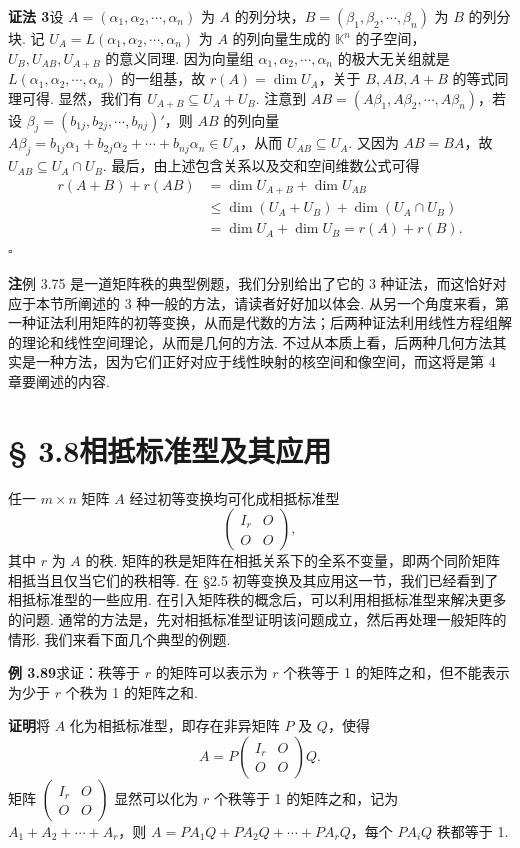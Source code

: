 \documentclass[UTF8,12pt,a4paper,fontset=fandol]{ctexart}
\begin{document}
\noindent\textbf{证法 3}\quad 设 $A=(\alpha_1,\alpha_2,\cdots,\alpha_n)$ 为 $A$ 的列分块，$B=(\beta_1,\beta_2,\cdots,\beta_n)$ 为 $B$ 的列分块. 记 $U_A=L(\alpha_1,\alpha_2,\cdots,\alpha_n)$ 为 $A$ 的列向量生成的 $\mathbb{K}^n$ 的子空间，$U_B,U_{AB},U_{A+B}$ 的意义同理. 因为向量组 $\alpha_1,\alpha_2,\cdots,\alpha_n$ 的极大无关组就是 $L(\alpha_1,\alpha_2,\cdots,\alpha_n)$ 的一组基，故 $r(A)=\dim U_A$，关于 $B,AB,A+B$ 的等式同理可得. 显然，我们有 $U_{A+B}\subseteq U_A+U_B$. 注意到 $AB=(A\beta_1,A\beta_2,\cdots,A\beta_n)$，若设 $\beta_j=(b_{1j},b_{2j},\cdots,b_{nj})'$，则 $AB$ 的列向量 $A\beta_j=b_{1j}\alpha_1+b_{2j}\alpha_2+\cdots+b_{nj}\alpha_n\in U_A$，从而 $U_{AB}\subseteq U_A$. 又因为 $AB=BA$，故 $U_{AB}\subseteq U_A\cap U_B$. 最后，由上述包含关系以及交和空间维数公式可得
\[
\begin{aligned}
r(A+B)+r(AB)&=\dim U_{A+B}+\dim U_{AB}\\
&\le \dim(U_A+U_B)+\dim(U_A\cap U_B)\\
&=\dim U_A+\dim U_B=r(A)+r(B).
\end{aligned}
\]
$\square$

\noindent\textbf{注}\quad 例 3.75 是一道矩阵秩的典型例题，我们分别给出了它的 3 种证法，而这恰好对应于本节所阐述的 3 种一般的方法，请读者好好加以体会. 从另一个角度来看，第一种证法利用矩阵的初等变换，从而是代数的方法；后两种证法利用线性方程组解的理论和线性空间理论，从而是几何的方法. 不过从本质上看，后两种几何方法其实是一种方法，因为它们正好对应于线性映射的核空间和像空间，而这将是第 4 章要阐述的内容.

\section*{§ 3.8\quad 相抵标准型及其应用}

任一 $m\times n$ 矩阵 $A$ 经过初等变换均可化成相抵标准型
\[
\begin{pmatrix}I_r&O\\O&O\end{pmatrix},
\]
其中 $r$ 为 $A$ 的秩. 矩阵的秩是矩阵在相抵关系下的全系不变量，即两个同阶矩阵相抵当且仅当它们的秩相等. 在 §2.5 初等变换及其应用这一节，我们已经看到了相抵标准型的一些应用. 在引入矩阵秩的概念后，可以利用相抵标准型来解决更多的问题. 通常的方法是，先对相抵标准型证明该问题成立，然后再处理一般矩阵的情形. 我们来看下面几个典型的例题.

\noindent\textbf{例 3.89}\quad 求证：秩等于 $r$ 的矩阵可以表示为 $r$ 个秩等于 1 的矩阵之和，但不能表示为少于 $r$ 个秩为 1 的矩阵之和.

\noindent\textbf{证明}\quad 将 $A$ 化为相抵标准型，即存在非异矩阵 $P$ 及 $Q$，使得
\[
A=P\begin{pmatrix}I_r&O\\O&O\end{pmatrix}Q.
\]
矩阵 $\begin{pmatrix}I_r&O\\O&O\end{pmatrix}$ 显然可以化为 $r$ 个秩等于 1 的矩阵之和，记为 $A_1+A_2+\cdots+A_r$，则 $A=PA_1Q+PA_2Q+\cdots+PA_rQ$，每个 $PA_iQ$ 秩都等于 1.
\end{document}

